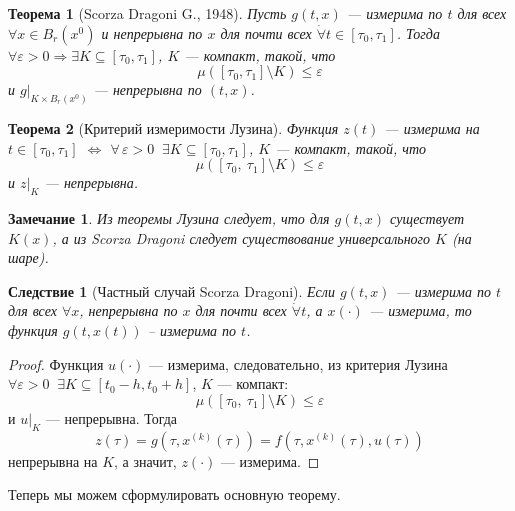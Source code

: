 \documentclass[12pt, a4paper]{article}
\theoremstyle{rusdef}
\newtheorem{theorem}{Теорема}
\newtheorem{remark}{Замечание}
\newtheorem{corol}{Следствие}
\begin{document}
\begin{theorem}[Scorza Dragoni G., 1948]
Пусть $g(t,x)$ --- измерима по $t$ для всех $\forall x \in B_r(x^0)$ и непрерывна по $x$ для почти всех $\dot{\forall} t \in [\tau_0, \tau_1]$. Тогда $\forall \varepsilon >0 \Rightarrow \exists K \subseteq [\tau_0, \tau_1]$, $K$ --- компакт, такой, что
$$
\mu ([\tau_0, \tau_1] \setminus K) \leqslant \varepsilon
$$
и $g \rvert_{K \times B_r(x^0)}$ --- непрерывна по $(t,x)$.
\end{theorem}
\begin{theorem}[Критерий измеримости Лузина]
Функция $z(t)$ --- измерима на $t \in[\tau_0, \tau_1]$ $\Leftrightarrow$ $\forall\,\varepsilon > 0 \;\; \exists K \subseteq [\tau_0, \tau_1]$, $K$ --- компакт, такой, что
$$
\mu([\tau_0,\ \tau_1] \setminus K) \leqslant \varepsilon
$$
и $z \rvert_{K}$ --- непрерывна.
\end{theorem}

\begin{remark}
Из теоремы Лузина следует, что для $g(t,x)$ существует $K(x)$, а из Scorza Dragoni следует существование универсального $K$ (на шаре).
\end{remark}

\begin{corol}[Частный случай Scorza Dragoni]
Если $g(t,x)$ --- измерима по $t$ для всех $\forall x$, непрерывна по $x$ для почти всех $\dot{\forall} t$, а $x(\cdot)$ --- измерима, то функция $g(t, x(t))$ -- измерима по $t$.
\end{corol}
\begin{proof}
Функция $u(\cdot)$ --- измерима, следовательно, из критерия Лузина $\forall \varepsilon > 0 \;\; \exists K \subseteq [t_0 - h, t_0 + h]$, $K$ --- компакт:
$$
\mu([\tau_0,\ \tau_1] \setminus K) \leqslant \varepsilon
$$
и $u \rvert_{K}$ --- непрерывна. Тогда
$$
z(\tau) = g(\tau, x^{(k)}(\tau)) = f(\tau, x^{(k)}(\tau), u(\tau))
$$
непрерывна на $K$, а значит, $z(\cdot)$ --- измерима.
\end{proof}

Теперь мы можем сформулировать основную теорему.
\end{document}

